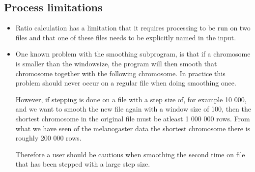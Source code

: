 \subsection{Process limitations}
\begin{itemize} 
\item Ratio calculation has a limitation that it requires processing to be run on two files and that one of these files needs to be explicitly named in the input.

\item One known problem with the smoothing subprogram, is that if a chromosome is smaller 
than the windowsize, the program will then smooth that chromosome together with 
the following chromosome. In practice this problem should never occur on a regular
file when doing smoothing once. 

However, if stepping is done on a file with a step size of, for example 10 000, and 
we want to smooth the new file again with a window size of 100, then the shortest
chromosome in the original file must be atleast 1 000 000 rows. From what we have seen
of the melanogaster data the shortest chromosome there is roughly 200 000 rows. 

Therefore a user should be cautious when smoothing the second time 
on file that has been stepped with a large step size.  
\end{itemize}

